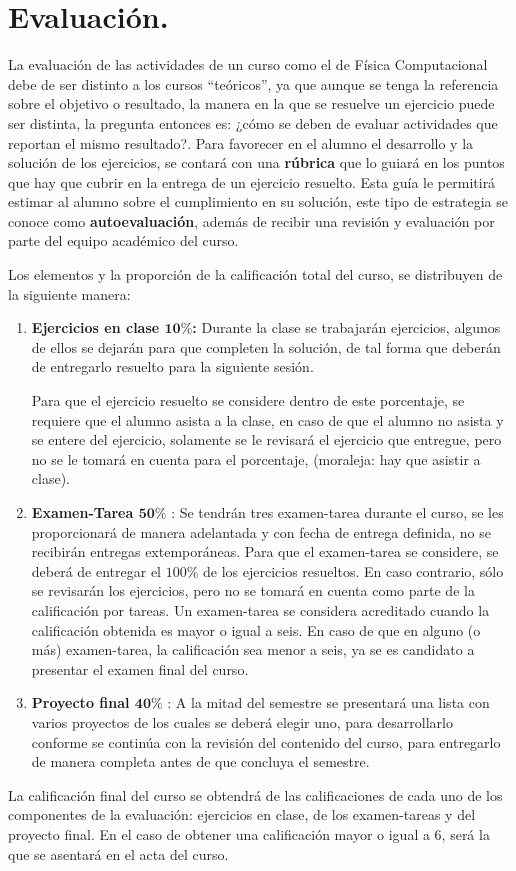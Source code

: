 \section{Evaluación.}

La evaluación de las actividades de un curso como el de Física Computacional debe de ser distinto a los cursos \enquote{teóricos}, ya que aunque se tenga la referencia sobre el objetivo o resultado, la manera en la que se resuelve un ejercicio puede ser distinta, la pregunta entonces es: ¿cómo se deben de evaluar actividades que reportan el mismo resultado?. Para favorecer en el alumno el desarrollo y la solución de los ejercicios, se contará con una \textbf{rúbrica} que lo guiará en los puntos que hay que cubrir en la entrega de un ejercicio resuelto. Esta guía le permitirá estimar al alumno sobre el cumplimiento en su solución, este tipo de estrategia se conoce como \textbf{autoevaluación}, además de recibir una revisión y evaluación por parte del equipo académico del curso.
\par
Los elementos y la proporción de la calificación total del curso, se distribuyen de la siguiente manera:
\begin{enumerate}[label=\alph*)]
\item \textbf{Ejercicios en clase $\mathbf{10\%}$:} Durante la clase se trabajarán ejercicios, algunos de ellos se dejarán para que completen la solución, de tal forma que deberán de entregarlo resuelto para la siguiente sesión.
\par
Para que el ejercicio resuelto se considere dentro de este porcentaje, se requiere que el alumno asista a la clase, en caso de que el alumno no asista y se entere del ejercicio, solamente se le revisará el ejercicio que entregue, pero no se le tomará en cuenta para el porcentaje, (moraleja: hay que asistir a clase).
\item \textbf{Examen-Tarea $\mathbf{50\%}$} : Se tendrán tres examen-tarea durante el curso, se les proporcionará de manera adelantada y con fecha de entrega definida, no se recibirán entregas extemporáneas. Para que el examen-tarea se considere, se deberá de entregar el $100\%$ de los ejercicios resueltos. En caso contrario, sólo se revisarán los ejercicios, pero no se tomará en cuenta como parte de la calificación por tareas. Un examen-tarea se considera acreditado cuando la calificación obtenida es mayor o igual a seis. En caso de que en alguno (o más) examen-tarea, la calificación sea menor a seis, ya se es candidato a presentar el examen final del curso.
\item \textbf{Proyecto final $\mathbf{40\%}$} : A la mitad del semestre se presentará una lista con varios proyectos de los cuales se deberá elegir uno, para desarrollarlo conforme se continúa con la revisión del contenido del curso, para entregarlo de manera completa antes de que concluya el semestre.
\end{enumerate}
La calificación final del curso se obtendrá de las calificaciones de cada uno de los componentes de la evaluación: ejercicios en clase, de los examen-tareas y del proyecto final. En el caso de obtener una calificación mayor o igual a $6$, será la que se asentará en el acta del curso.

